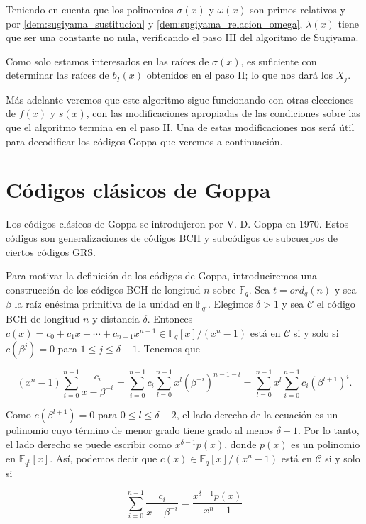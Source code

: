 Teniendo en cuenta que los polinomios $\sigma(x)$ y $\omega(x)$ son primos relativos y por \ref{dem:sugiyama_sustitucion} y \ref{dem:sugiyama_relacion_omega}, $\lambda(x)$ tiene que ser una constante no nula, verificando el paso III del algoritmo de Sugiyama.

Como solo estamos interesados en las raíces de $\sigma(x)$, es suficiente con determinar las raíces de $b_I(x)$ obtenidos en el paso II; lo que nos dará los $X_j$. 

Más adelante veremos que este algoritmo sigue funcionando con otras elecciones de $f(x)$ y $s(x)$, con las modificaciones apropiadas de las condiciones sobre las que el algoritmo termina en el paso II. Una de estas modificaciones nos será útil para decodificar los códigos Goppa que veremos a continuación.

\section{Códigos clásicos de Goppa}

Los códigos clásicos de Goppa se introdujeron por V. D. Goppa en 1970. Estos códigos son generalizaciones de códigos BCH y subcódigos de subcuerpos de ciertos códigos GRS.

Para motivar la definición de los códigos de Goppa, introduciremos una construcción de los códigos BCH de longitud $n$ sobre $\mathbb{F}_q$. Sea $t = ord_q(n)$ y sea $\beta$ la raíz enésima primitiva de la unidad en $\mathbb{F}_{q^t}$. Elegimos $\delta > 1$ y sea $\mathcal{C}$ el código BCH de longitud $n$ y distancia $\delta$. Entonces $c(x) = c_0 + c_1x + \cdots + c_{n-1}x^{n-1} \in \mathbb{F}_q [x] / (x^n - 1)$ está en $\mathcal{C}$ si y solo si $c(\beta^j) = 0$ para $1 \leq j \leq \delta - 1$. Tenemos que 

$$(x^n - 1) \sum_{i=0}^{n-1} \frac{c_i}{x - \beta ^{-i}} = \sum_{i=0}^{n-1} c_i \sum_{l=0}^{n-1} x^l \left( \beta ^{-i} \right) ^{n-1-l} = \sum_{l=0}^{n-1} x^l \sum_{i=0}^{n-1} c_i \left( \beta^{l+1} \right) ^i.$$

Como $c(\beta^{l+1}) = 0$ para $0 \leq l \leq \delta - 2$, el lado derecho de la ecuación es un polinomio cuyo término de menor grado tiene grado al menos $\delta - 1$. Por lo tanto, el lado derecho se puede escribir como $x^{\delta - 1} p(x)$, donde $p(x)$ es un polinomio en $\mathbb{F}_{q^t}[x]$. Así, podemos decir que $c(x) \in \mathbb{F}_q[x] / (x^n - 1)$ está en $\mathcal{C}$ si y solo si 

$$\sum_{i=0}^{n-1} \frac{c_i}{x - \beta ^{-i}} = \frac{x^{\delta - 1} p(x)}{x^n - 1}$$

